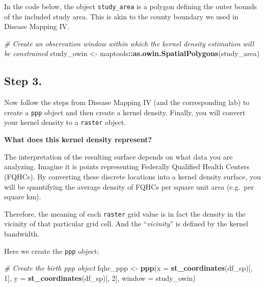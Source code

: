 \documentclass[
]{book}
\newenvironment{Shaded}{\begin{snugshade}}{\end{snugshade}}
\newcommand{\AttributeTok}[1]{\textcolor[rgb]{0.13,0.29,0.53}{#1}}
\newcommand{\CommentTok}[1]{\textcolor[rgb]{0.56,0.35,0.01}{\textit{#1}}}
\newcommand{\DecValTok}[1]{\textcolor[rgb]{0.00,0.00,0.81}{#1}}
\newcommand{\FunctionTok}[1]{\textcolor[rgb]{0.13,0.29,0.53}{\textbf{#1}}}
\newcommand{\NormalTok}[1]{#1}
\newcommand{\OtherTok}[1]{\textcolor[rgb]{0.56,0.35,0.01}{#1}}
\newcommand{\SpecialCharTok}[1]{\textcolor[rgb]{0.81,0.36,0.00}{\textbf{#1}}}
\newenvironment{rmdnote}[1]
  {
  \begin{itemize}
  \renewcommand{\labelitemi}{
    \raisebox{-.7\height}[0pt][0pt]{
      {\setkeys{Gin}{width=3em,keepaspectratio}\texttt{[image: images/\#1]}}
    }
  }
  \setlength{\fboxsep}{1em}
  \begin{note}
  \item
  }
  {
  \end{note}
  \end{itemize}
  }
\begin{document}
In the code below, the object \texttt{study\_area} is a polygon defining the outer bounds of the included study area. This is akin to the county boundary we used in Disease Mapping IV.

\begin{Shaded}
\begin{Highlighting}[]
\CommentTok{\# Create an observation window within which the kernel density estimation will be constrained}
\NormalTok{study\_owin }\OtherTok{\textless{}{-}}\NormalTok{ maptools}\SpecialCharTok{::}\FunctionTok{as.owin.SpatialPolygons}\NormalTok{(study\_area)}
\end{Highlighting}
\end{Shaded}

\hypertarget{step-3.}{%
\subsection{Step 3.}\label{step-3.}}

Now follow the steps from Disease Mapping IV (and the corresponding lab) to create a \texttt{ppp} object and then create a kernel density. Finally, you will convert your kernel density to a \texttt{raster} object.

\begin{rmdnote}{note}
\textbf{What does this kernel density represent?}

The interpretation of the resulting surface depends on what data you are analyzing. Imagine it is points representing Federally Qualified Health Centers (FQHCs). By converting these discrete locations into a kernel density surface, you will be quantifying the average density of FQHCs per square unit area (e.g.~per square km).

Therefore, the meaning of each \texttt{raster} grid value is in fact the density in the vicinity of that particular grid cell. And the ``\emph{vicinity}'' is defined by the kernel bandwidth.

\end{rmdnote}

Here we create the \texttt{ppp} object:

\begin{Shaded}
\begin{Highlighting}[]
\CommentTok{\# Create the birth ppp object}
\NormalTok{fqhc\_ppp }\OtherTok{\textless{}{-}} \FunctionTok{ppp}\NormalTok{(}\AttributeTok{x =} \FunctionTok{st\_coordinates}\NormalTok{(df\_sp)[, }\DecValTok{1}\NormalTok{], }
             \AttributeTok{y =} \FunctionTok{st\_coordinates}\NormalTok{(df\_sp)[, }\DecValTok{2}\NormalTok{],}
             \AttributeTok{window =}\NormalTok{ study\_owin)}
\end{Highlighting}
\end{Shaded}
\end{document}
